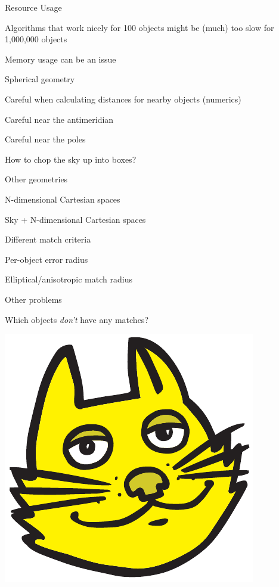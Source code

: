 \documentclass[20pt,landscape]{foils}
\begin{document}
\begin{list1}
  \item Resource Usage
\vspace*{-0.2cm}
  \begin{list2}
    \item Algorithms that work nicely for 100 objects might be
          (much) too slow for 1,000,000 objects
    \item Memory usage can be an issue
  \end{list2}
  \item Spherical geometry
\vspace*{-0.2cm}
  \begin{list2}
    \item Careful when calculating distances for nearby objects (numerics)
    \item Careful near the antimeridian
    \item Careful near the poles
    \item How to chop the sky up into boxes?
  \end{list2}
  \item Other geometries
\vspace*{-0.2cm}
  \begin{list2}
    \item N-dimensional Cartesian spaces
    \item Sky + N-dimensional Cartesian spaces
  \end{list2}
  \item Different match criteria
\vspace*{-0.2cm}
  \begin{list2}
    \item Per-object error radius
    \item Elliptical/anisotropic match radius
  \end{list2}
  \item Other problems
\vspace*{-0.2cm}
  \begin{list2}
    \item Which objects {\sl don't\/} have any matches?
  \end{list2}
\end{list1}

\newpage

\begin{center}
\includegraphics[scale=2.7]{tclogo.pdf}
\end{center}

\label{lastPage}
\end{document}
